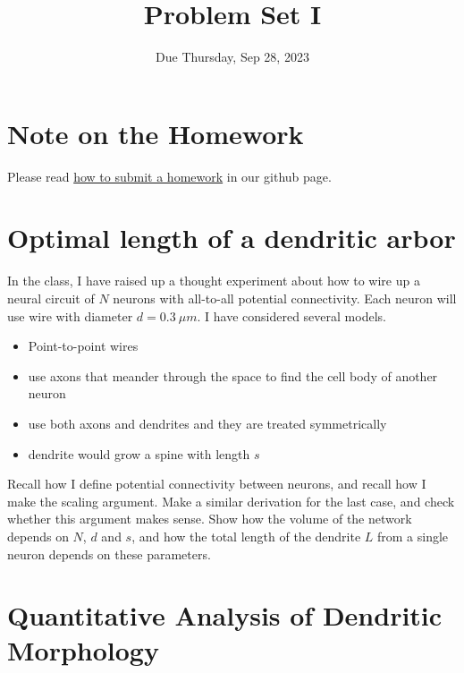 \documentclass{article}
\title{Problem Set I}
\date{Due Thursday, Sep  28, 2023}
\begin{document}
\maketitle

\section*{Note on the Homework}

Please read \href{https://github.com/Wenlab/Computation-Neuro-Course/wiki/%E4%BD%9C%E4%B8%9A%E6%8F%90%E4%BA%A4}{how to submit a homework} in our github page.

\section*{Optimal length of a dendritic arbor}
In the class, I have raised up a thought experiment about how to wire up a neural circuit of $N$ neurons with all-to-all potential connectivity. Each neuron will use wire with diameter $d = 0.3\ \mu m$. I have considered several models.
\begin{itemize}
\item {Point-to-point wires} 
\item {use axons that meander through the space to find the cell body of another neuron}
\item {use both axons and dendrites and they are treated symmetrically}
\item {dendrite would grow a spine with length $s$}
\end{itemize} 
Recall how I define potential connectivity between neurons, and recall how I make the scaling argument. Make a similar derivation for the last case, and check whether this argument makes sense. Show how the volume of the network depends on $N$, $d$ and $s$,
and how the total length of the dendrite $L$ from a single neuron depends on these parameters. 


\section*{Quantitative Analysis of Dendritic Morphology}
\end{document}
